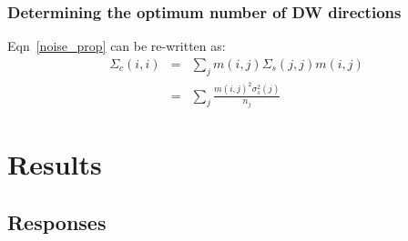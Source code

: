 \documentclass{article}
\begin{document}
\subsubsection{Determining the optimum number of DW directions}


Eqn~\ref{noise_prop} can be re-written as:
\begin{eqnarray}
\Sigma_c(i,i) & = & \sum_j m(i,j) \Sigma_s(j,j) m(i,j) \\
& = & \sum_j \frac{ m(i,j)^2 \sigma^2_s(j) }{ n_j }
\end{eqnarray}




\section{Results}

\subsection{Responses}
\end{document}
